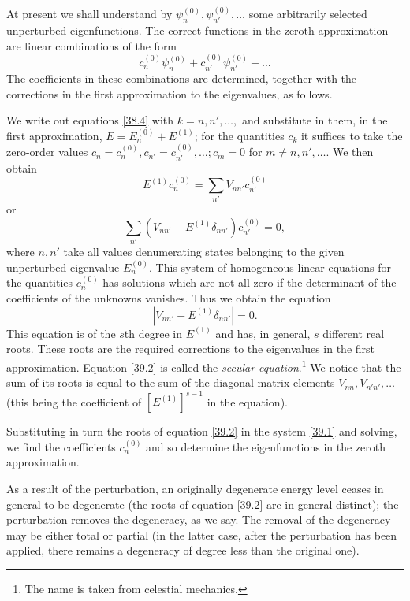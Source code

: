 At present we shall understand by $ \psi_n^{(0)} , \psi_{n'}^{(0)}, \dots$ some arbitrarily selected unperturbed eigenfunctions. The correct functions in the zeroth approximation are linear combinations of the form
\[ c_n^{(0)}\psi_n^{(0)}+c_{n'}^{(0)}\psi_{n'}^{(0)}+\dots \]
The coefficients in these combinations are determined, together with the corrections in the first approximation to the eigenvalues, as follows.

We write out equations \eqref{38.4} with $ k = n, n', \dots, $ and substitute in them, in the first approximation, $ E = E_n^{(0)} + E^{(1)} $; for the quantities $ c_k $ it suffices to take the zero-order values $ c_n = c_n^{(0)}, c_{n'} = c_{n'}^{(0)}, \dots; c_m = 0 $ for $ m \ne n, n', \dots. $ We then obtain
\[ E^{(1)}c_n^{(0)}=\sum_{n'}V_{nn'}c_{n'}^{(0)} \]
or
\begin{equation}\label{39.1}
\sum_{n'}\left(V_{nn'}-E^{(1)}\delta_{nn'} \right)c_{n'}^{(0)}=0,
\end{equation}
where $ n, n' $ take all values denumerating states belonging to the given unperturbed eigenvalue $ E_n^{(0)} $. This system of homogeneous linear equations for the quantities $ c_n^{(0)} $ has solutions which are not all zero if the determinant of the coefficients of the unknowns vanishes. Thus we obtain the equation
\begin{equation}\label{39.2}
\left|V_{nn'}-E^{(1)}\delta_{nn'} \right|=0.
\end{equation}
This equation is of the $ s $th degree in $ E^{(1)} $ and has, in general, $ s $ different real roots. These roots are the required corrections to the eigenvalues in the first approximation. Equation \eqref{39.2} is called the \textit{secular equation}.\footnote{The name is taken from celestial mechanics.} We notice that the sum of its roots is equal to the sum of the diagonal matrix elements $ V_{nn}, V_{n'n'}, \dots $ (this being the coefficient of $ [E^{(1)}]^{s-1} $ in the equation).

Substituting in turn the roots of equation \eqref{39.2} in the system \eqref{39.1} and solving, we find the coefficients $ c_n^{(0)} $ and so determine the eigenfunctions in the zeroth approximation.

As a result of the perturbation, an originally degenerate energy level ceases in general to be degenerate (the roots of equation \eqref{39.2} are in general distinct); the perturbation removes the degeneracy, as we say. The removal of the degeneracy may be either total or partial (in the latter case, after the perturbation has been applied, there remains a degeneracy of degree less than the original one).

